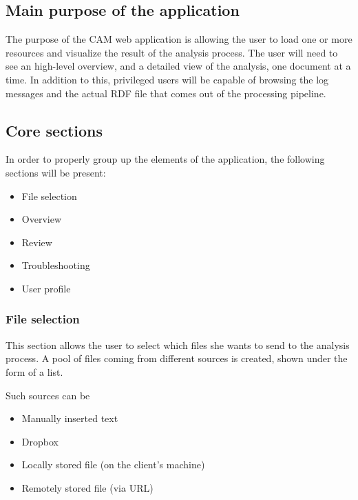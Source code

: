 \documentclass[12pt,oneside,svgnames]{memoir}
\begin{document}
\subsection{Main purpose of the
application}\label{main-purpose-of-the-application}

The purpose of the CAM web application is allowing the user to load one
or more resources and visualize the result of the analysis process. The
user will need to see an high-level overview, and a detailed view of the
analysis, one document at a time. In addition to this, privileged users
will be capable of browsing the log messages and the actual RDF file
that comes out of the processing pipeline.

\subsection{Core sections}\label{core-sections}

In order to properly group up the elements of the application, the
following sections will be present:

\begin{itemize}
\itemsep1pt\parskip0pt
\item
  File selection
\item
  Overview
\item
  Review
\item
  Troubleshooting
\item
  User profile
\end{itemize}

\subsubsection*{File selection}\label{file-selection}

This section allows the user to select which files she wants to send to
the analysis process. A pool of files coming from different sources is
created, shown under the form of a list.

Such sources can be

\begin{itemize}
\itemsep1pt\parskip0pt
\item
  Manually inserted text
\item
  Dropbox
\item
  Locally stored file (on the client's machine)
\item
  Remotely stored file (via URL)
\end{itemize}
\end{document}
